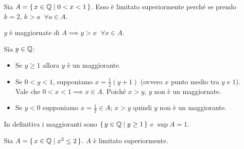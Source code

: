 \begin{example}
Sia $A = \set{x \in \mathbb Q| 0 < x < 1}$.
Esso è limitato superiormente perché se prendo $k = 2$, $k > a \;\; \forall a \in A$.

$y$ è maggiornate di $A \implies y > x \; \; \forall x \in A$.

Sia $y \in \mathbb Q$:
\begin{itemize}
\item Se $y \ge 1$ allora $y$ è un maggiorante.
\item Se $0 < y < 1$, supponiamo $x = \frac{1}{2}(y+1)$ (ovvero $x$ punto medio tra $y$ e $1$). Vale che $0 < x < 1 \implies x \in A$. Poiché $x > y$, $y$ non è un maggiornate.
\item Se $y < 0$ supponiamo $x = \frac{1}{2} \in A$; $x > y$ quindi $y$ non è un maggiorante.
\end{itemize}

In definitiva i maggioranti sono $\set{y \in \mathbb Q| y \ge 1}$ e $\sup A = 1$.
\end{example}

\begin{example}
Sia $A = \set{x \in \mathbb Q| x^2 \le 2}$. $A$ è limitato superiormente.\end{example}

